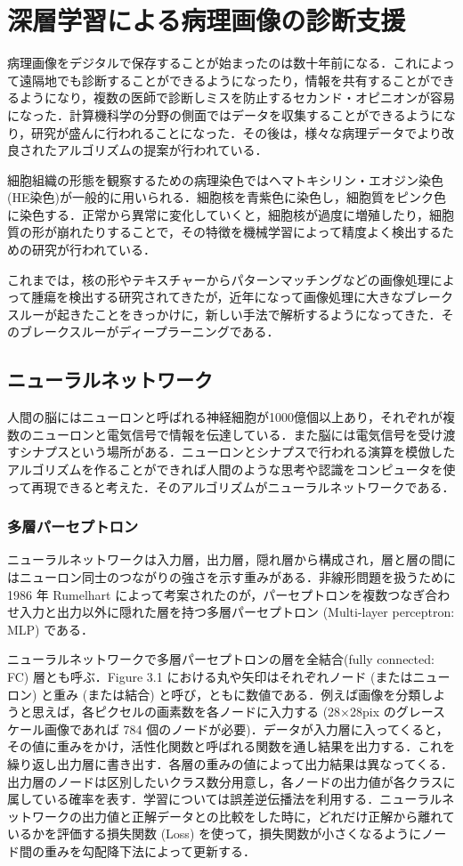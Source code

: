 \chapter{深層学習による病理画像の診断支援}
\label{chap_review}

病理画像をデジタルで保存することが始まったのは数十年前になる．これによって遠隔地でも診断することができるようになったり，情報を共有することができるようになり，複数の医師で診断しミスを防止するセカンド・オピニオンが容易になった．計算機科学の分野の側面ではデータを収集することができるようになり，研究が盛んに行われることになった．その後は，様々な病理データでより改良されたアルゴリズムの提案が行われている．

細胞組織の形態を観察するための病理染色ではヘマトキシリン・エオジン染色(HE染色)が一般的に用いられる．細胞核を青紫色に染色し，細胞質をピンク色に染色する．正常から異常に変化していくと，細胞核が過度に増殖したり，細胞質の形が崩れたりすることで，その特徴を機械学習によって精度よく検出するための研究が行われている．

これまでは，核の形やテキスチャーからパターンマッチングなどの画像処理によって腫瘍を検出する研究されてきたが，近年になって画像処理に大きなブレークスルーが起きたことをきっかけに，新しい手法で解析するようになってきた．そのブレークスルーがディープラーニングである．

\section{ニューラルネットワーク}
人間の脳にはニューロンと呼ばれる神経細胞が1000億個以上あり，それぞれが複数のニューロンと電気信号で情報を伝達している．また脳には電気信号を受け渡すシナプスという場所がある．ニューロンとシナプスで行われる演算を模倣したアルゴリズムを作ることができれば人間のような思考や認識をコンピュータを使って再現できると考えた．そのアルゴリズムがニューラルネットワークである．

\subsection{多層パーセプトロン}
ニューラルネットワークは入力層，出力層，隠れ層から構成され，層と層の間にはニューロン同士のつながりの強さを示す重みがある．非線形問題を扱うために 1986 年 Rumelhart によって考案されたのが，パーセプトロンを複数つなぎ合わせ入力と出力以外に隠れた層を持つ多層パーセプトロン (Multi-layer perceptron: MLP) である．

ニューラルネットワークで多層パーセプトロンの層を全結合(fully connected: FC) 層とも呼ぶ．Figure 3.1 における丸や矢印はそれぞれノード (またはニューロン) と重み (または結合) と呼び，ともに数値である．例えば画像を分類しようと思えば，各ピクセルの画素数を各ノードに入力する (28×28pix のグレースケール画像であれば 784 個のノードが必要)．データが入力層に入ってくると，その値に重みをかけ，活性化関数と呼ばれる関数を通し結果を出力する．これを繰り返し出力層に書き出す．各層の重みの値によって出力結果は異なってくる．出力層のノードは区別したいクラス数分用意し，各ノードの出力値が各クラスに属している確率を表す．学習については誤差逆伝播法を利用する．ニューラルネットワークの出力値と正解データとの比較をした時に，どれだけ正解から離れているかを評価する損失関数 (Loss) を使って，損失関数が小さくなるようにノード間の重みを勾配降下法によって更新する．

